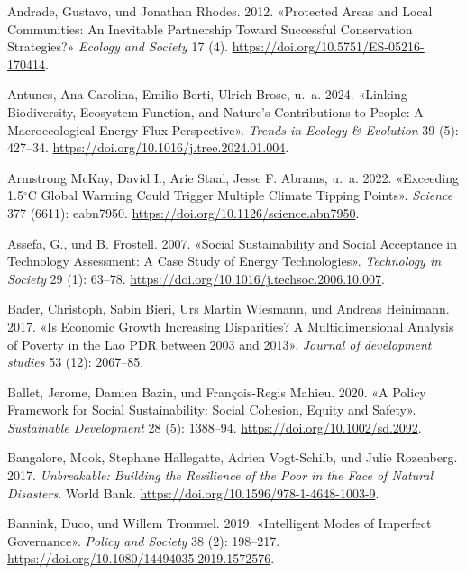 \documentclass[
  nswissgerman,
  a4paper,
  openany]{book}
\newlength{\cslhangindent}
\newenvironment{CSLReferences}[2] %
 {\begin{list}{}{%
  \setlength{\itemindent}{0pt}
  \setlength{\leftmargin}{0pt}
  \setlength{\parsep}{0pt}
  \ifodd #1
   \setlength{\leftmargin}{\cslhangindent}
   \setlength{\itemindent}{-1\cslhangindent}
  \fi
  \setlength{\itemsep}{#2\baselineskip}}}
 {\end{list}}
\begin{document}
\begin{CSLReferences}{1}{1}
Andrade, Gustavo, und Jonathan Rhodes. 2012. {«Protected {Areas} and
{Local Communities}: An {Inevitable Partnership} Toward {Successful
Conservation Strategies}?»} \emph{Ecology and Society} 17 (4).
\url{https://doi.org/10.5751/ES-05216-170414}.

Antunes, Ana Carolina, Emilio Berti, Ulrich Brose, u.~a. 2024. {«Linking
Biodiversity, Ecosystem Function, and {Nature}'s Contributions to
People: A Macroecological Energy Flux Perspective»}. \emph{Trends in
Ecology \& Evolution} 39 (5): 427--34.
\url{https://doi.org/10.1016/j.tree.2024.01.004}.

Armstrong McKay, David I., Arie Staal, Jesse F. Abrams, u.~a. 2022.
{«Exceeding 1.5{\(^\circ\)}{C} Global Warming Could Trigger Multiple
Climate Tipping Points»}. \emph{Science} 377 (6611): eabn7950.
\url{https://doi.org/10.1126/science.abn7950}.

Assefa, G., und B. Frostell. 2007. {«Social Sustainability and Social
Acceptance in Technology Assessment: {A} Case Study of Energy
Technologies»}. \emph{Technology in Society} 29 (1): 63--78.
\url{https://doi.org/10.1016/j.techsoc.2006.10.007}.

Bader, Christoph, Sabin Bieri, Urs Martin Wiesmann, und Andreas
Heinimann. 2017. {«Is Economic Growth Increasing Disparities? {A}
Multidimensional Analysis of Poverty in the {Lao PDR} between 2003 and
2013»}. \emph{Journal of development studies} 53 (12): 2067--85.

Ballet, Jerome, Damien Bazin, und François-Regis Mahieu. 2020. {«A
Policy Framework for Social Sustainability: {Social} Cohesion, Equity
and Safety»}. \emph{Sustainable Development} 28 (5): 1388--94.
\url{https://doi.org/10.1002/sd.2092}.

Bangalore, Mook, Stephane Hallegatte, Adrien Vogt-Schilb, und Julie
Rozenberg. 2017. \emph{Unbreakable: {Building} the {Resilience} of the
{Poor} in the {Face} of {Natural Disasters}}. World Bank.
\url{https://doi.org/10.1596/978-1-4648-1003-9}.

Bannink, Duco, und Willem Trommel. 2019. {«Intelligent Modes of
Imperfect Governance»}. \emph{Policy and Society} 38 (2): 198--217.
\url{https://doi.org/10.1080/14494035.2019.1572576}.


\end{CSLReferences}
\end{document}
